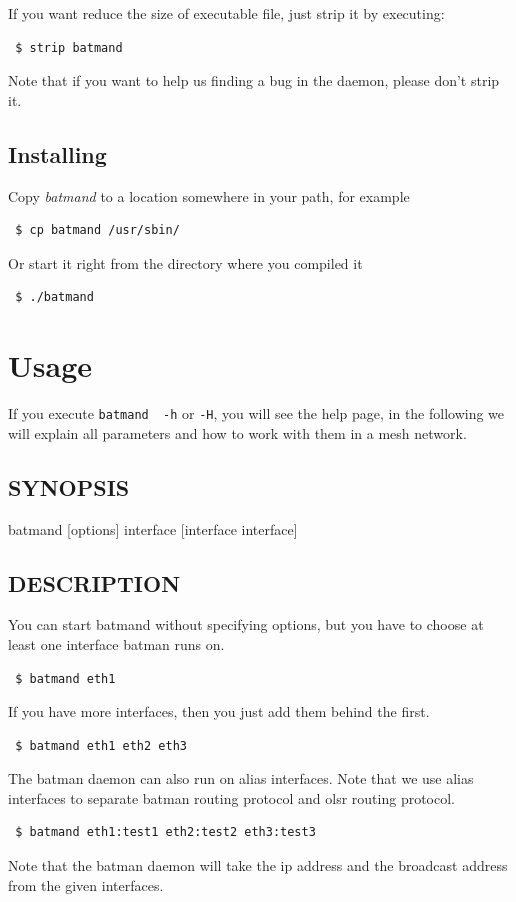 \documentclass[
	12pt,
	a4paper,
	twoside,
	english,
	headsepline,
	footnosepline,
	automark,
	normalheadings,
	openany,
	cleardoubleplain,
	abstracton,
	idxtotoc,
	liststotoc,
	bibtotoc,
 	BCOR8mm,
]{scrartcl}
\begin{document}
If you want reduce the size of executable file, just strip it by executing: 

\begin{verbatim}
 $ strip batmand
\end{verbatim}

Note that if you want to help us finding a bug in the daemon, please don't strip it.

\subsection{Installing}
Copy \emph{batmand} to a location somewhere in your path, for example
\begin{verbatim}
 $ cp batmand /usr/sbin/
\end{verbatim}
Or start it right from the directory where you compiled it
\begin{verbatim}
 $ ./batmand
\end{verbatim}


\section{Usage}
If you execute \verb+batmand  -h+ or  \verb+-H+, you will see the help page, in the following we will explain  all parameters and how to work with them in a mesh network.

\subsection{SYNOPSIS}
\begin{verb}
batmand [options] interface [interface interface]
\end{verb}


\subsection{DESCRIPTION}
You can start batmand without specifying options, but you have to choose at least one  interface batman runs on.
\begin{verbatim}
 $ batmand eth1
\end{verbatim}
If you have more interfaces, then you just add them behind the first.
\begin{verbatim}
 $ batmand eth1 eth2 eth3
\end{verbatim}
The batman daemon can also run on alias interfaces. Note that we use alias interfaces to separate batman routing protocol and olsr routing  protocol.
\begin{verbatim}
 $ batmand eth1:test1 eth2:test2 eth3:test3
\end{verbatim}
Note that the batman daemon will take the ip address and the broadcast address from the  given interfaces.
\end{document}
